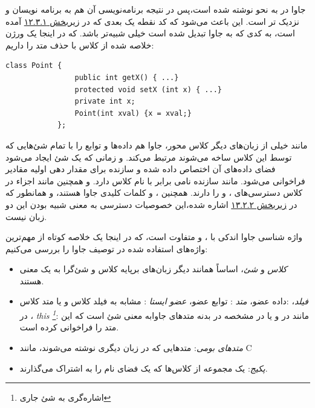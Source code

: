 \documentclass[a4paper,12pt]{report}
\newcommand{\lrInlineMono}[1]{{\color{steelBlue}\lr{\texttt{#1}}}}
\begin{document}
 	جاوا در به نحو 
 	نوشته شده است،‌پس در نتیجه برنامه‌نویسی آن هم به برنامه نویسان 
 	 و 
 	نزدیک تر است. این باعث می‌شود که کد نقطه یک بعدی که در 
 	\hyperref[subsec1:sec3:chap12]{
	زیربخش ۱۲.۳.۱} آمده است، به کدی که به جاوا تبدیل شده است خیلی شبیه‌تر باشد. که در اینجا یک ورژن خلاصه شده از کلاس با حذف متد 
 	را داریم:
 		
	\begin{latin}
		\small
		\begin{lstlisting}[]
			class Point {
				public int getX() { ...}
				protected void setX (int x) { ...}
				private int x;
				Point(int xval) {x = xval;}
			};		
		\end{lstlisting}
	\end{latin}	
			
	مانند خیلی از زبان‌های دیگر کلاس محور، جاوا هم داده‌ها و توابع را با تمام شئ‌هایی که توسط این کلاس ساخه می‌شوند مرتبط می‌کند. و زمانی که یک شئ ایجاد می‌شود فضای داده‌های آن اختصاص داده شده و سازنده برای مقدار دهی اولیه مقادیر فراخوانی می‌شود. مانند 
	سازنده نامی برابر با نام  کلاس دارد. و همچنین مانند 
	اجزاء در کلاس 
	 ‌دسترسی‌های
	،  و 
	 را دارند.
	  همچنین
	،  و 
		کلمات کلیدی جاوا هستند، و همانطور که در 
	\linebreak\hyperref[subsec2:sec2:chap13]{زیربخش ۱۳.۲.۲} 
اشاره شده،‌این خصوصیات دسترسی به معنی شبیه بودن این دو زبان نیست.

	واژه شناسی جاوا اندکی با
	،  و 
	متفاوت است، که در اینجا یک خلاصه کوتاه از مهم‌ترین واژه‌های استفاده شده در توصیف جاوا را بررسی می‌کنیم:
	
	
	\begin{itemize}[nosep]
		\renewcommand{\labelitemi}{\color{gray}\scriptsize$\blacksquare$}
		\item \textit{
		کلاس} و \textit{شئ}، اساساً همانند دیگر زبان‌های برپایه کلاس و شئ‌گرا به یک معنی هستند.
		
		\item \textit{
		فیلد}،
		:داده عضو،
		\textit{
		متد
		}: توابع عضو، 
		\textit{
		عضو ایستا
		}
		: مشابه به فیلد کلاس و یا متد کلاس در 
		 ،
		\textit{
		this \footnote{
		اشاره‌گری به شئ جاری}}: مانند 
		\lrInlineMono{this} در  
		و یا 
		\lrInlineMono{self} در  
		مشخصه
		 \lrInlineMono{this}
		  در بدنه متد‌های جاوابه معنی شئ است که این متد را فراخوانی کرده است.
		\item \textit{
		متدهای بومی}: متدهایی که در زبان دیگری نوشته می‌شوند، مانند C
		\item \textit{
		پکیج‌}: یک مجموعه از کلاس‌ها که یک فضای نام را به اشتراک می‌گذارند.
	\end{itemize}
\end{document}
